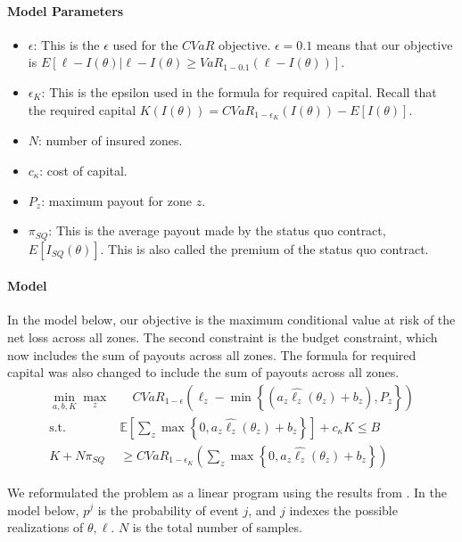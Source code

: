 \documentclass[11pt]{article}
\begin{document}
    \paragraph*{Model Parameters}
    \begin{itemize}
        \item $\epsilon$: This is the $\epsilon$ used for the $CVaR$ objective.  $\epsilon = 0.1$ means that our objective is $E[\ell - I(\theta)|\ell -I(\theta) \geq VaR_{1-0.1}\left ( \ell - I(\theta) \right )]$.  
        \item $\epsilon_K$: This is the epsilon used in the formula for required capital. Recall that the required capital $K(I(\theta)) = CVaR_{1-\epsilon_K}(I(\theta)) - E[I(\theta)]$. 
        \item $N$: number of insured zones.
        \item $c_{\kappa}$: cost of capital. 
        \item $P_z$: maximum payout for zone $z$.
        \item $\pi_{SQ}$: This is the average payout made by the status quo contract, $E[I_{SQ}(\theta)]$. This is also called the premium of the status quo contract.   
    \end{itemize}

    \paragraph*{Model}
    In the model below, our objective is the maximum conditional value at risk of the net loss across all zones. The second constraint is the budget constraint, which now includes the sum of payouts across all zones. The formula for required capital was also changed to include the sum of payouts across all zones. 
    \begin{align}
      \min_{a,b,K} \max_z &\quad CVaR_{1-\epsilon}\left (\ell_z - \min \left \{ (a_z\hat{\ell_z}(\theta_z) + b_z), P_z \right \} \right )\\
      \text{s.t.   } & \mathbb{E}\left [ \sum_z \max \left \{ 0, a_z\hat{\ell_z}(\theta_z) + b_z \right \} \right ] + c_{\kappa} K \leq B\\
      K + N\pi_{SQ} &\geq CVaR_{1-\epsilon_K} \left( \sum_z \max \left \{ 0,a_z\hat{\ell_z}(\theta_z) + b_z \right \} \right )
    \end{align}

    We reformulated the problem as a linear program  using the results from \cite{rockafellar2000optimization}. In the model below, $p^j$ is the probability of event $j$, and $j$ indexes the possible realizations of $\theta, \ell$. $N$ is the total number of samples. 
\end{document}
